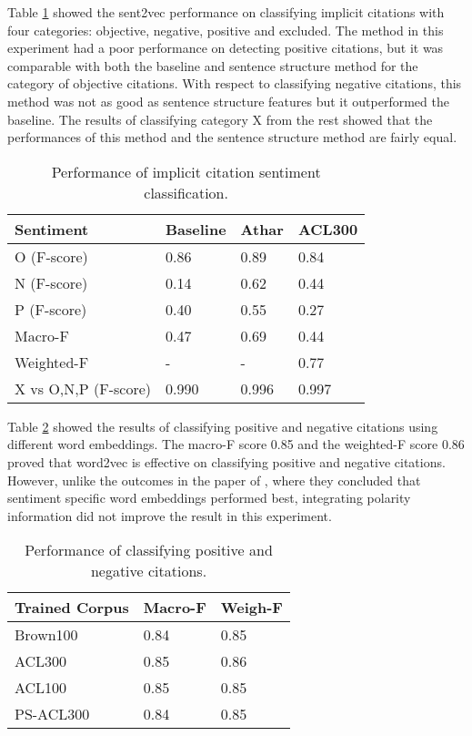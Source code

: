 \documentclass[11pt]{llncs}
\begin{document}
Table \ref{tab:result2} showed the sent2vec performance on classifying implicit citations with four categories: objective, negative, positive and excluded. 
The method in this experiment had a poor performance on detecting positive citations, but it was comparable with both the baseline and sentence structure method \cite{Athar:2012:DIC:2391171.2391176} for the category of objective citations. With respect to classifying negative citations, this method was not as good as sentence structure features
but it outperformed the baseline. The results of classifying category X from the rest showed that the performances of this method and the sentence structure method are fairly equal.

\begin{table}
\centering
\small
\begin{tabular}{|p{3cm}|p{3cm}|p{3cm}|p{3cm}|}
\hline
{\bf Sentiment } & {\bf Baseline} & {\bf Athar} & {\bf ACL300} \\\hline
{O (F-score)} & {0.86} & {0.89} & {0.84} \\
{N (F-score)} & {0.14} & {0.62} & {0.44} \\
{P (F-score)} & {0.40} & {0.55} & {0.27} \\\hline
{Macro-F}& {0.47} & {0.69} & {0.44} \\
{Weighted-F}& {-} & {-} & {0.77} \\
\hline 
{X vs O,N,P (F-score)} & {0.990} & {0.996} & {0.997} \\\hline
\end{tabular}
\caption{Performance of implicit citation sentiment classification.}\label{tab:result2}

\end{table}

Table \ref{tab:result3} showed the results of classifying positive and negative citations using different word embeddings. The macro-F score 0.85 and the weighted-F score 0.86 proved that word2vec is effective on classifying positive and negative citations.  
However, unlike the outcomes in the paper of
\cite{tang2014learning}, where they concluded that sentiment specific word embeddings performed best, integrating polarity information did not improve the result in this experiment. 

\begin{table} 
\centering
\small
\begin{tabular}{|p{3cm}|p{3cm}|p{3cm}|}
\hline
{\bf Trained Corpus } & {\bf Macro-F }& {\bf Weigh-F }\\\hline
{Brown100} & {0.84} & {0.85}\\
{ACL300} & {0.85} & {0.86}\\
{ACL100} & {0.85} & {0.85}\\
{PS-ACL300} & {0.84}& {0.85}\\\hline
\end{tabular}
\caption{Performance of classifying positive and negative citations. 
}\label{tab:result3}
\end{table}
\end{document}
